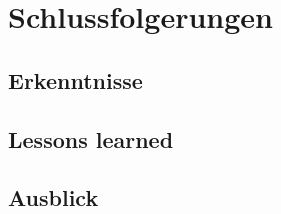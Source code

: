 \chapter{Schlussfolgerungen}

\section{Erkenntnisse}



\section{Lessons learned}



\section{Ausblick}